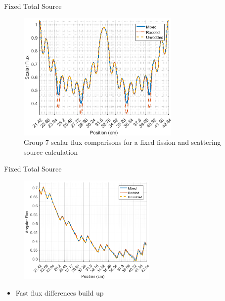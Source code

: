 \begin{frame}[t]{Fixed Total Source}
    
    \begin{figure}[H]
      \centering
      \includegraphics[width=0.7\textwidth]{../figs/1dmoc-50mix-fixedscat-scalflux7.png}
      \caption{Group 7 scalar flux comparisons for a fixed fission and scattering source calculation}\label{f:1dmoc-fixed-50-scalflux7}
    \end{figure}
    
\end{frame}


\begin{frame}[t]{Fixed Total Source}

\begin{figure}[H]
    \centering
    \includegraphics[width=0.6\textwidth]{../figs/1dmoc-50mix-fixedscat-angflux1.png}
\end{figure}
\begin{itemize}
  \item Fast flux differences build up
\end{itemize}

\end{frame}

